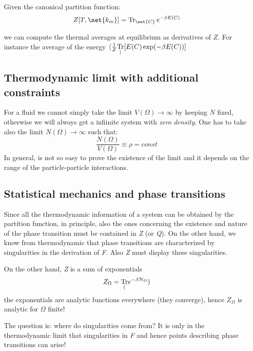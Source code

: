 \documentclass[../../Main/Main.tex]{subfiles}
\begin{document}
Given the canonical partition function:
\begin{equation}
  Z[T, \set{ k_{m} }] = \Trace_{ \set{ C }} e^{-\beta E(C)}
\end{equation}

we can compute the thermal averages at equilibrium as derivatives of $Z$. For instance the average of the energy \( \langle \frac{1}{Z}\underset{\rangle}{\text{Tr}} [E(C) \exp(-\beta E(C))] \)




\subsection{Thermodynamic limit with additional constraints}
For a fluid we cannot simply take the limit \( V (\Omega ) \rightarrow \infty  \) by keeping \( N \) fixed, otherwise we will always get a infiinite system with \emph{zero density}. One has to take also the limit \( N(\Omega ) \rightarrow \infty  \) such that:
\begin{equation*}
  \frac{N (\Omega )}{V (\Omega )} \equiv \rho = const
\end{equation*}
In general, is not so easy to prove the existence of the limit and it depends on the range of the particle-particle interactions.

\subsection{Statistical mechanics and phase transitions}
Since all the thermodynamic information of a system can be obtained by the partition function, in principle, also the ones concerning the existence and nature of the phase transition must be contained in \emph{Z} (or \emph{Q}). On the other hand, we know from thermodynamic that phase transitions are characterized by singularities in the derivation of \emph{F}. Also \emph{Z} must display these singularities.

On the other hand, \emph{Z} is a sum of exponentials
\begin{equation}
  Z_ \Omega = \underset{(}{\text{Tr}}e^{-\beta \mathcal{H}_ \Omega } )
\end{equation}
the exponentials are analytic functions everywhere (they converge), hence \( Z_ \Omega  \) is analytic for \( \Omega  \) finite!

The question is: where do singularities come from?
It is only in the thermodynamic limit that singularities in \emph{F} and hence points describing phase transitions can arise!
\end{document}
